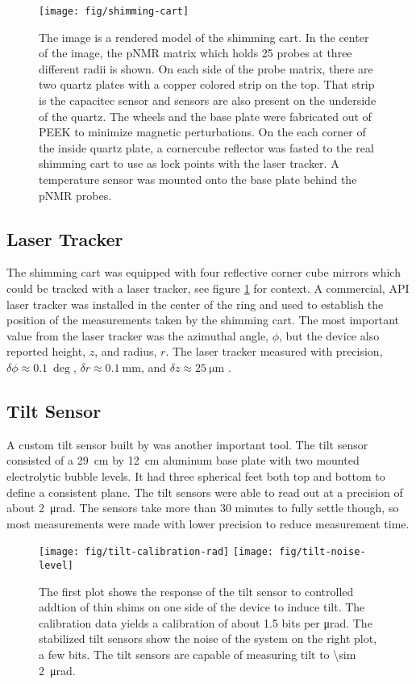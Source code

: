 \begin{figure}
\label{fig:shimming-cart}
\centering
\texttt{[image: fig/shimming-cart]}
\caption{The image is a rendered model of the shimming cart. In the center of the image, the pNMR matrix which holds 25 probes at three different radii is shown.  On each side of the probe matrix, there are two quartz plates with a copper colored strip on the top.  That strip is the capacitec sensor and sensors are also present on the underside of the quartz.  The wheels and the base plate were fabricated out of PEEK to minimize magnetic perturbations. On the each corner of the inside quartz plate, a cornercube reflector was fasted to the real shimming cart to use as lock points with the laser tracker. A temperature sensor was mounted onto the base plate behind the pNMR probes.}
\end{figure}

\subsection{Laser Tracker}
The shimming cart was equipped with four reflective corner cube mirrors which could be tracked with a laser tracker, see figure \ref{fig:shimming-cart} for context.  A commercial, API laser tracker was installed in the center of the ring and used to establish the position of the measurements taken by the shimming cart.  The most important value from the laser tracker was the azimuthal angle, $\phi$, but the device also reported height, $z$, and radius, $r$.  The laser tracker measured with precision, $\delta\phi \approx \SI{0.1}{\deg}$, $\delta r \approx \SI{0.1}{\milli\meter}$, and $\delta z \approx \SI{25}{\micro\meter}$ .

\subsection{Tilt Sensor}
A custom tilt sensor built by \uw was another important tool.  The tilt sensor consisted of a \SI{29}{\cm} by \SI{12}{\cm} aluminum base plate with two mounted electrolytic bubble levels.  It had three spherical feet both top and bottom to define a consistent plane.  The tilt sensors were able to read out at a precision of about \SI{2}{\micro\radian}.  The sensors take more than 30 minutes to fully settle though, so most measurements were made with lower precision to reduce measurement time.

\begin{figure}
\label{fig:tilt-calibration}
\centering
\texttt{[image: fig/tilt-calibration-rad]}
\texttt{[image: fig/tilt-noise-level]}
\caption{The first plot shows the response of the tilt sensor to controlled addtion of thin shims on one side of the device to induce tilt.  The calibration data yields a calibration of about 1.5 bits per \si{\micro \radian}.  The stabilized tilt sensors show the noise of the system on the right plot, a few bits.  The tilt sensors are capable of measuring tilt to \SI{\sim 2}{\micro \radian}.}
\end{figure}

